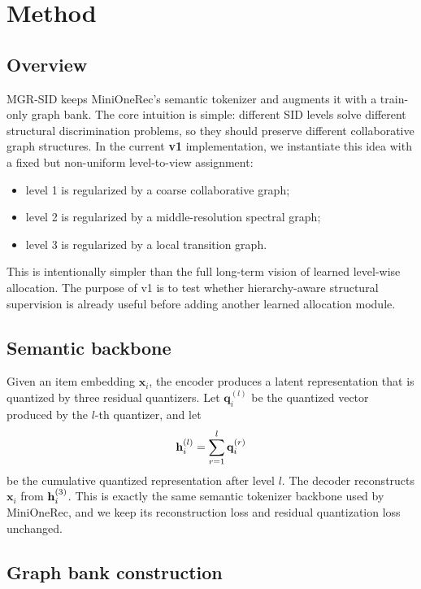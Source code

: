 \section{Method}
\label{sec:method}

\subsection{Overview}

MGR-SID keeps MiniOneRec's semantic \rqvae{} tokenizer and augments it with a train-only graph bank. The core intuition is simple: different SID levels solve different structural discrimination problems, so they should preserve different collaborative graph structures. In the current \textbf{v1} implementation, we instantiate this idea with a fixed but non-uniform level-to-view assignment:
\begin{itemize}[leftmargin=1.4em]
  \item level 1 is regularized by a coarse collaborative graph;
  \item level 2 is regularized by a middle-resolution spectral graph;
  \item level 3 is regularized by a local transition graph.
\end{itemize}

This is intentionally simpler than the full long-term vision of learned level-wise allocation. The purpose of v1 is to test whether hierarchy-aware structural supervision is already useful before adding another learned allocation module.

\subsection{Semantic backbone}

Given an item embedding $\mathbf{x}_i$, the encoder produces a latent representation that is quantized by three residual quantizers. Let $\mathbf{q}_i^{(l)}$ be the quantized vector produced by the $l$-th quantizer, and let
\begin{equation}
\mathbf{h}_i^{(l)} = \sum_{r=1}^{l} \mathbf{q}_i^{(r)}
\end{equation}
be the cumulative quantized representation after level $l$. The decoder reconstructs $\mathbf{x}_i$ from $\mathbf{h}_i^{(3)}$. This is exactly the same semantic tokenizer backbone used by MiniOneRec, and we keep its reconstruction loss and residual quantization loss unchanged.

\subsection{Graph bank construction}


